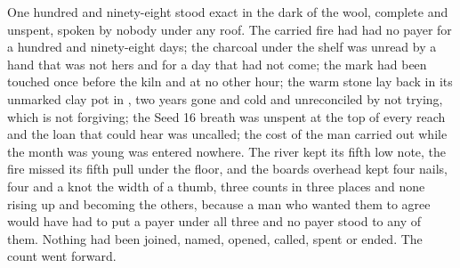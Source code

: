 One hundred and ninety-eight stood exact in the dark of the wool, complete and unspent, spoken by nobody under any roof. The carried fire had had no payer for a hundred and ninety-eight days; the charcoal under the shelf was unread by a hand that was not hers and for a day that had not come; the mark had been touched once before the kiln and at no other hour; the warm stone lay back in its unmarked clay pot in , two years gone and cold and unreconciled by not trying, which is not forgiving; the Seed 16 breath was unspent at the top of every reach and the loan that could hear was uncalled; the cost of the man carried out while the month was young was entered nowhere. The river kept its fifth low note, the fire missed its fifth pull under the floor, and the boards overhead kept four nails, four and a knot the width of a thumb, three counts in three places and none rising up and becoming the others, because a man who wanted them to agree would have had to put a payer under all three and no payer stood to any of them. Nothing had been joined, named, opened, called, spent or ended. The count went forward.
